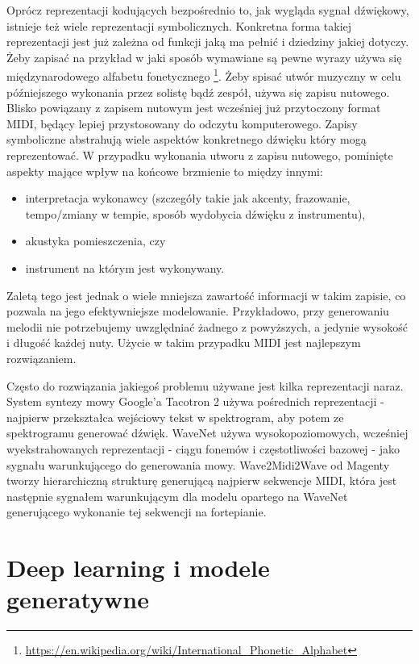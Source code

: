 \documentclass[magisterska]{pracamgr}
\renewcommand{\cite}{\citep}
\begin{document}
Oprócz reprezentacji kodujących bezpośrednio to, jak wygląda sygnał dźwiękowy, istnieje też wiele reprezentacji symbolicznych. Konkretna forma takiej reprezentacji jest już zależna od funkcji jaką ma pełnić i dziedziny jakiej dotyczy. Żeby zapisać na przykład w jaki sposób wymawiane są pewne wyrazy używa się międzynarodowego alfabetu fonetycznego \footnote{\url{https://en.wikipedia.org/wiki/International_Phonetic_Alphabet}}. Żeby spisać utwór muzyczny w celu późniejszego wykonania przez solistę bądź zespół, używa się zapisu nutowego. Blisko powiązany z zapisem nutowym jest wcześniej już przytoczony format MIDI, będący lepiej przystosowany do odczytu komputerowego. Zapisy symboliczne abstrahują wiele aspektów konkretnego dźwięku który mogą reprezentować. W przypadku wykonania utworu z zapisu nutowego, pominięte aspekty mające wpływ na końcowe brzmienie to między innymi:
\begin{itemize}
    \setlength\itemsep{0em}
    \item interpretacja wykonawcy (szczegóły takie jak akcenty, frazowanie, tempo/zmiany w tempie, sposób wydobycia dźwięku z instrumentu),
    \item akustyka pomieszczenia, czy
    \item instrument na którym jest wykonywany.
\end{itemize}
Zaletą tego jest jednak o wiele mniejsza zawartość informacji w takim zapisie, co pozwala na jego efektywniejsze modelowanie. Przykładowo, przy generowaniu melodii nie potrzebujemy uwzględniać żadnego z powyższych, a jedynie wysokość i długość każdej nuty. Użycie w takim przypadku MIDI jest najlepszym rozwiązaniem.

Często do rozwiązania jakiegoś problemu używane jest kilka reprezentacji naraz. System syntezy mowy Google'a Tacotron 2 \cite{shen2018natural} używa pośrednich reprezentacji - najpierw przekształca wejściowy tekst w spektrogram, aby potem ze spektrogramu generować dźwięk. WaveNet \cite{oord2016wavenet} używa wysokopoziomowych, wcześniej wyekstrahowanych reprezentacji - ciągu fonemów i częstotliwości bazowej - jako sygnału warunkującego do generowania mowy. Wave2Midi2Wave od Magenty \cite{hawthorne2019maestro} tworzy hierarchiczną strukturę generującą najpierw sekwencje MIDI, która jest następnie sygnałem warunkującym dla modelu opartego na WaveNet generującego wykonanie tej sekwencji na fortepianie.

\section{Deep learning i modele generatywne}
\end{document}
